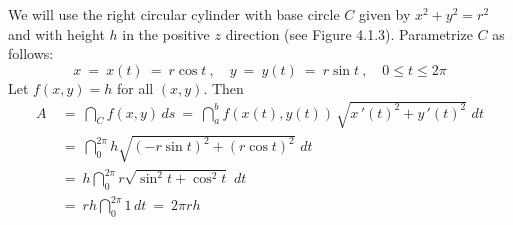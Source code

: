 %   
\begin{solu} We will use the right circular cylinder with base
 circle $C$ given by $x^2 + y^2 = r^2$ and with height $h$ in the positive $z$ direction (see Figure 4.1.3).
 Parametrize $C$ as follows:
 \begin{displaymath}
  x ~=~ x(t) ~=~ r \cos t ~,\quad y ~=~ y(t) ~=~ r \sin t~,\quad 0 \le t \le 2\pi
 \end{displaymath}
 Let $f(x,y) = h$ for all $(x,y)$. Then
 \begin{align*}
  A ~&=~ \dint_C f(x,y)\,ds ~=~ \dint_a^b f(x(t),y(t)) \,\sqrt{x\,'(t)^2 + y\,'(t)^2}\,\,dt\\
   &=~ \dint_0^{2\pi} h \sqrt{(-r \sin t)^2 + (r \cos t)^2}\,\,dt\\
   &=~ h\dint_0^{2\pi} r \sqrt{\sin^2 t + \cos^2 t}\,\,dt\\
   &=~ rh\dint_0^{2\pi} 1 \,dt ~=~ 2\pi r h
 \end{align*}
\end{solu}

